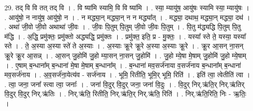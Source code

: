 \documentclass[17pt]{extarticle}
\begin{document}
29. तद् वि वि तत् तद् वि । . वि ष्या॑मि स्यामि॒ वि वि ष्या॑मि । . स्या॒ म्यायु॑ष॒ आयु॑षः स्यामि स्या॒ म्यायु॑षः । . आयु॑षो॒ न नायु॑ष॒ आयु॑षो॒ न । . न मद्ध्या॒न् मद्ध्या॒न् न न मद्ध्या᳚त् । . मद्ध्या॒ दथाथ॒ मद्ध्या॒न् मद्ध्या॒ दथ॑ । . अथा॑ जी॒वो जी॒वो अथाथा॑ जी॒वः । . जी॒वः पि॒तुम् पि॒तुम् जी॒वो जी॒वः पि॒तुम् । . पि॒तु म॑द्ध्यद्धि पि॒तुम् पि॒तु म॑द्धि । . अ॒द्धि॒ प्रमु॑क्तः॒ प्रमु॑क्तो अद्ध्यद्धि॒ प्रमु॑क्तः । . प्रमु॑क्त॒ इति॒ प्र - मु॒क्तः॒ । . यस्या᳚ स्ते ते॒ यस्या॒ यस्या᳚ स्ते । . ते॒ अ॒स्या अ॒स्या स्ते॑ ते अ॒स्याः । . अ॒स्याः क्रू॒रे क्रू॒रे अ॒स्या अ॒स्याः क्रू॒रे । . क्रू॒र आ॒सन् ना॒सन् क्रू॒रे क्रू॒र आ॒सन्न् । . आ॒सन् जु॒होमि॑ जु॒हो म्या॒सन् ना॒सन् जु॒होमि॑ । . जु॒हो म्ये॒षा मे॒षाम् जु॒होमि॑ जु॒हो म्ये॒षाम् । . ए॒षाम् ब॒न्धाना᳚म् ब॒न्धाना॑ मे॒षा मे॒षाम् ब॒न्धाना᳚म् । . ब॒न्धाना॑ मव॒सर्ज॑नाया व॒सर्ज॑नाय ब॒न्धाना᳚म् ब॒न्धाना॑ मव॒सर्ज॑नाय । . अ॒व॒सर्ज॑ना॒येत्य॑व - सर्ज॑नाय । . भूमि॒ रितीति॒ भूमि॒र् भूमि॒ रिति॑ । . इति॑ त्वा॒ त्वेतीति॑ त्वा । . त्वा॒ जना॒ जना᳚ स्त्वा त्वा॒ जनाः᳚ । . जना॑ वि॒दुर् वि॒दुर् जना॒ जना॑ वि॒दुः । . वि॒दुर् निर्.ऋ॑ति॒र् निर्.ऋ॑तिर् वि॒दुर् वि॒दुर् निर्.ऋ॑तिः । . निर्.ऋ॑ति॒ रितीति॒ निर्.ऋ॑ति॒र् निर्.ऋ॑ति॒ रिति॑ । . निर्.ऋ॑ति॒रिति॒ निः - ऋ॒तिः॒ । \newline
\end{document}
